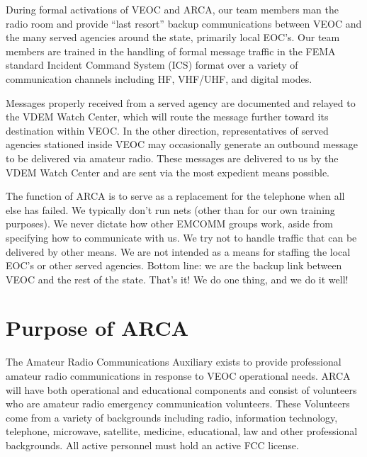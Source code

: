 \documentclass[pdflatex,letterpaper,twoside,12pt]{book}
\begin{document}
During formal activations of VEOC and ARCA, our team members man the radio room and provide ``last resort'' backup communications between VEOC and the many served agencies around the state, primarily local EOC's.  Our team members are trained in the handling of formal message traffic in the FEMA standard Incident Command System (ICS) format over a variety of communication channels including HF, VHF/UHF, and digital modes.

Messages properly received from a served agency are documented and relayed to the VDEM Watch Center, which will route the message further toward its destination within VEOC.  In the other direction, representatives of served agencies stationed inside VEOC may occasionally generate an outbound message to be delivered via amateur radio.  These messages are delivered to us by the VDEM Watch Center and are sent via the most expedient means possible.

The function of ARCA is to serve as a replacement for the telephone when all else has failed.  We typically don't run nets (other than for our own training purposes).  We never dictate how other EMCOMM groups work, aside from specifying how to communicate with us.  We try not to handle traffic that can be delivered by other means.  We are not intended as a means for staffing the local EOC's or other served agencies.  Bottom line:  we are the backup link between VEOC and the rest of the state.  That's it!  We do one thing, and we do it well!


\section{Purpose of ARCA}

The Amateur Radio Communications Auxiliary exists to provide professional amateur radio communications in response to VEOC operational needs.  ARCA will have both operational and educational components and consist of volunteers who are amateur radio emergency communication volunteers.  These Volunteers come from a variety of backgrounds including radio, information technology, telephone, microwave, satellite, medicine, educational, law and other professional backgrounds.  All active personnel must hold an active FCC license.

\end{document}
